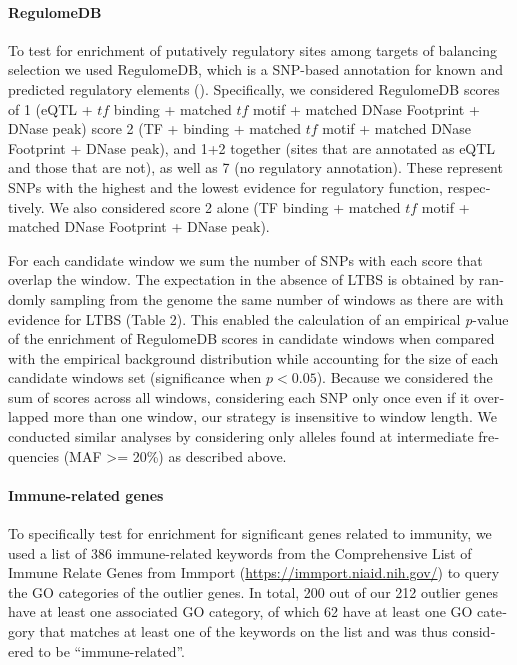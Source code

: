 \begin{refsection}
\begin{otherlanguage}{english}
\paragraph{RegulomeDB}

To test for enrichment of putatively regulatory sites among targets of balancing selection we used RegulomeDB, which is a SNP-based annotation for known and predicted regulatory elements (\cite{Boyle2012}). Specifically, we considered RegulomeDB scores of 1 (eQTL + $tf$ binding + matched $tf$ motif + matched DNase Footprint + DNase peak) score 2 (TF + binding + matched $tf$ motif + matched DNase Footprint + DNase peak), and 1+2 together (sites that are annotated as eQTL and those that are not), as well as 7 (no regulatory annotation). These represent SNPs with the highest and the lowest evidence for regulatory function, respectively. We also considered score 2 alone (TF binding + matched $tf$ motif + matched DNase Footprint + DNase peak). 
%

For each candidate window we sum the number of SNPs with each score that overlap the window. The expectation in the absence of LTBS is obtained by randomly sampling from the genome the same number of windows as there are with evidence for LTBS (Table 2). This enabled the calculation of an empirical \emph{p}-value of the enrichment of RegulomeDB scores in candidate windows when compared with the empirical background distribution while accounting for the size of each candidate windows set (significance when $p<0.05$). Because we considered the sum of scores across all windows, considering each SNP only once even if it overlapped more than one window, our strategy is insensitive to window length. We conducted similar analyses by considering only alleles found at intermediate frequencies (MAF >= 20\%) as described above.

\paragraph{Immune-related genes}
To specifically test for enrichment for significant genes related to immunity, we used a list of 386 immune-related keywords from the Comprehensive List of Immune Relate Genes from Immport (\url{https://immport.niaid.nih.gov/}) to query the GO categories of the outlier genes. In total, 200 out of our 212 outlier genes have at least one associated GO category, of which 62 have at least one GO category that matches at least one of the keywords on the list and was thus considered to be “immune-related”.


\end{otherlanguage}
\end{refsection}
